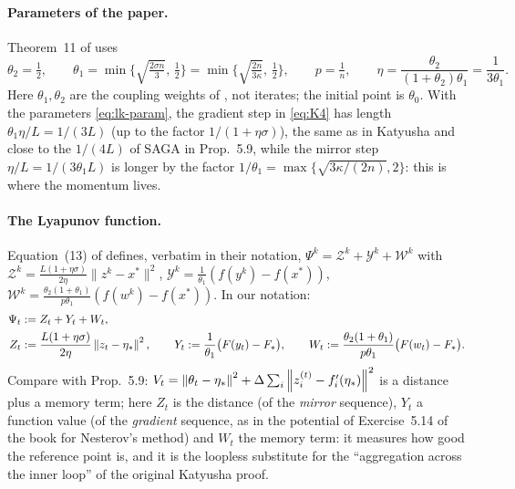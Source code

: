 \paragraph{Parameters of the paper.} Theorem~11 of \cite{kovalev2020dont} uses
\begin{equation}\label{eq:lk-param}
\theta_2=\tfrac12,\qquad \theta_1=\min\Big\{\sqrt{\tfrac{2\sigma n}{3}},\,\tfrac12\Big\}=\min\Big\{\sqrt{\tfrac{2n}{3\kappa}},\,\tfrac12\Big\},\qquad p=\tfrac1n,\qquad \eta=\frac{\theta_2}{(1+\theta_2)\theta_1}=\frac1{3\theta_1}.
\end{equation}
Here $\theta_1,\theta_2$ are the coupling weights of \cite{kovalev2020dont}, not iterates; the initial point is $\theta_0$. With the parameters \eqref{eq:lk-param}, the gradient step in \eqref{eq:K4} has length $\theta_1\eta/L=1/(3L)$ (up to the factor $1/(1+\eta\sigma)$), the same as in Katyusha and close to the $1/(4L)$ of SAGA in Prop.~5.9, while the mirror step $\eta/L=1/(3\theta_1L)$ is longer by the factor $1/\theta_1=\max\{\sqrt{3\kappa/(2n)},2\}$: this is where the momentum lives.

\paragraph{The Lyapunov function.} Equation~(13) of \cite{kovalev2020dont} defines, verbatim in their notation, $\Psi^k=\mathcal Z^k+\mathcal Y^k+\mathcal W^k$ with $\mathcal Z^k=\frac{L(1+\eta\sigma)}{2\eta}\|z^k-x^\ast\|^2$, $\mathcal Y^k=\frac1{\theta_1}(f(y^k)-f(x^\ast))$, $\mathcal W^k=\frac{\theta_2(1+\theta_1)}{p\theta_1}(f(w^k)-f(x^\ast))$. In our notation:
\begin{equation}\label{eq:lk-lyap}
\begin{aligned}
\Psi_t &:= Z_t+Y_t+W_t,\\
Z_t&:=\frac{L(1+\eta\sigma)}{2\eta}\left\|z_t-\eta_\ast\right\|^2,\qquad Y_t:=\frac1{\theta_1}\big(F(y_t)-F_\ast\big),\qquad W_t:=\frac{\theta_2(1+\theta_1)}{p\theta_1}\big(F(w_t)-F_\ast\big).
\end{aligned}
\end{equation}
Compare with Prop.~5.9: $V_t=\left\|\theta_t-\eta_\ast\right\|^2+\Delta\sum_i\left\|z_i^{(t)}-f'_i(\eta_\ast)\right\|^2$ is a distance plus a memory term; here $Z_t$ is the distance (of the \emph{mirror} sequence), $Y_t$ a function value (of the \emph{gradient} sequence, as in the potential of Exercise~5.14 of the book for Nesterov's method) and $W_t$ the memory term: it measures how good the reference point is, and it is the loopless substitute for the ``aggregation across the inner loop'' of the original Katyusha proof.

